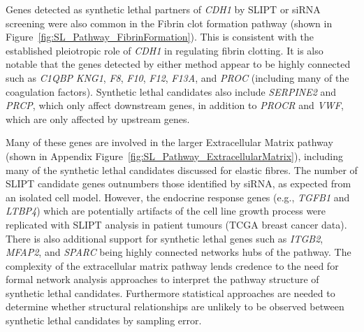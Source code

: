 Genes detected as synthetic lethal partners of \textit{CDH1} by \gls{SLIPT} or \gls{siRNA} screening were also common in the Fibrin clot formation pathway (shown in Figure~\ref{fig:SL_Pathway_FibrinFormation}). This is consistent with the established pleiotropic role of \textit{CDH1} in regulating fibrin clotting. It is also notable that the genes detected by either method appear to be highly connected such as \textit{C1QBP} \textit{KNG1}, \textit{F8}, \textit{F10}, \textit{F12}, \textit{F13A}, and \textit{PROC} (including many of the coagulation factors). Synthetic lethal candidates also include \textit{SERPINE2} and \textit{PRCP}, which only affect downstream genes, in addition to \textit{PROCR} and \textit{VWF}, which are only affected by upstream genes. 

\begin{figure*}[!htb]
  \begin{center}
   }
   \end{center}
   \caption[Synthetic Lethality in the Fibrin Clot Formation]{\small \textbf{Synthetic Lethality in the Fibrin Clot Formation.} The Reactome Fibrin Clot Formation pathway with synthetic lethal candidates coloured as shown in the legend.
}
\label{fig:SL_Pathway_FibrinFormation}
\end{figure*}


Many of these genes are involved in the larger Extracellular Matrix pathway (shown in Appendix Figure~\ref{fig:SL_Pathway_ExtracellularMatrix}), including many of the synthetic lethal candidates discussed for elastic fibres. The number of \gls{SLIPT} candidate genes outnumbers those identified by \gls{siRNA}, as expected from an isolated cell model. However, the endocrine response genes (e.g., \textit{TGFB1} and \textit{LTBP4}) which are potentially artifacts of the cell line growth process were replicated with \gls{SLIPT} analysis in patient tumours (TCGA breast cancer data). There is also additional support for synthetic lethal genes such as \textit{ITGB2}, \textit{MFAP2}, and \textit{SPARC} being highly connected networks hubs of the pathway. The complexity of the extracellular matrix pathway lends credence to the need for formal network analysis approaches to interpret the pathway structure of synthetic lethal candidates. Furthermore statistical approaches are needed to determine whether structural relationships are unlikely to be observed between synthetic lethal candidates by sampling error. 

